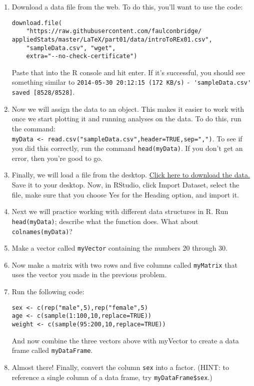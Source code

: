\begin{enumerate}
	\item Download a data file from the web. To do this, you'll want to use the code:
		\begin{framed}
		\begin{Verbatim}[samepage=TRUE]
download.file(
    "https://raw.githubusercontent.com/faulconbridge/
appliedStats/master/LaTeX/part01/data/introToREx01.csv",
    "sampleData.csv", "wget",
    extra="--no-check-certificate")
		\end{Verbatim}
		\end{framed}
	Paste that into the R console and hit enter. If it's successful, you should see something similar to \verb|2014-05-30 20:12:15 (172 KB/s)| \verb|- 'sampleData.csv' saved [8528/8528]|.
	
	\item Now we will assign the data to an object. This makes it easier to work with once we start plotting it and running analyses on the data. To do this, run the command: \\\verb|myData <- read.csv("sampleData.csv",header=TRUE,sep=",")|. To see if you did this correctly, run the command \verb|head(myData)|. If you don't get an error, then you're good to go.
	
	\item Finally, we will load a file from the desktop. \href{https://raw.githubusercontent.com/faulconbridge/appliedStats/master/LaTeX/part01/data/introToREx01.csv}{Click here to download the data.} Save it to your desktop. Now, in RStudio, click Import Dataset, select the file, make sure that you choose Yes for the Heading option, and import it.
	
	\item Next we will practice working with different data structures in R. Run \verb|head(myData)|; describe what the function does. What about \verb|colnames(myData)|?
	
	\item Make a vector called \verb|myVector| containing the numbers 20 through 30.
	
	\item Now make a matrix with two rows and five columns called \verb|myMatrix| that uses the vector you made in the previous problem.
	
	\item Run the following code:
	
		\begin{framed}
		\begin{Verbatim}[samepage=TRUE]
sex <- c(rep("male",5),rep("female",5)
age <- c(sample(1:100,10,replace=TRUE))
weight <- c(sample(95:200,10,replace=TRUE))
		\end{Verbatim}
		\end{framed}
	And now combine the three vectors above with myVector to create a data frame called \verb|myDataFrame|.
	
	\item Almost there! Finally, convert the column \verb|sex| into a factor. (HINT: to reference a single column of a data frame, try \verb|myDataFrame$sex|.)
\end{enumerate}
